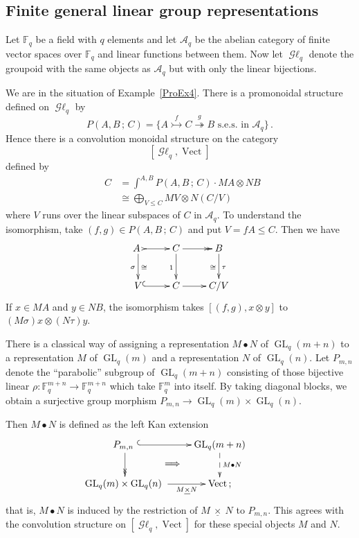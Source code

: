 \documentclass[a4paper,12pt]{article}
\theoremstyle{definition}
\theoremstyle{fact}
\theoremstyle{genquest}
\theoremstyle{step}
\newcommand{\catA}{\mathcal{A}}
\newcommand{\FF}{\mathbb{F}}
\newcommand{\GL}{\operatorname{GL}}
\newcommand{\catGL}{\mathop{\mathcal{G}\ell}\nolimits}
\newcommand{\Vect}{\operatorname{Vect}}
\begin{document}
\subsection{Finite general linear group representations} 

Let $\FF_q$ be a field with $q$ elements
and let $\catA_q$ be the abelian category of finite vector spaces over $\FF_q$ and linear functions between them.   
Now let $\catGL_q$ denote the groupoid with the same objects as $\catA_q$ but with only the linear bijections.


We are in the situation of Example~\ref{ProEx4}.   
There is a promonoidal structure defined on $\catGL_q$ by 
\[
P(A,B\,;\,C) = \{A \stackrel{f}{\rightarrowtail}  C  \stackrel{g}{\twoheadrightarrow} B \text{ s.e.s. in } \catA_q\}\,.
\]
Hence there is a convolution monoidal structure on the category
\[
[\catGL_q, \Vect]
\]
defined by
\begin{align*}
\mathop{(M \bullet N)} C &= \int^{A,B} P(A,B\,;\,C) \cdot MA \otimes NB
\\
&\cong \bigoplus_{V \leq C} MV \otimes N(C/V)
\end{align*}
where $V$ runs over the linear subspaces of $C$ in $\catA_q$.  
To understand the isomorphism, take $(f,g) \in P (A,B\,;\,C)$ and put $V = fA \leq C$.    
Then we have
\[
\xymatrix{
A \  \ar[d]_\sigma^\cong  \ar@{>->}[r] &C \ar[d]_1 \ar@{>>}[r] &    B  \ar[d]_\cong^\tau \\
 V \ar@{^{(}->}[r] &  C \ar[r] &     C/V 
 }\]
If $x \in  MA$ and $y \in NB$, the isomorphism takes $[(f,g),x\otimes y]$ to $(M\sigma) x \otimes (N\tau) y$.

\medskip

There is a classical way of assigning a representation $M \bullet N$ of $\GL_q (m+n)$ to a representation $M$ of $\GL_q(m)$ and a representation $N$ of $\GL_q(n)$.   Let $P_{m,n}$ denote the ``parabolic'' subgroup of $\GL_q(m+n)$ consisting of those bijective linear $\rho : \FF_q^{m+n} \to \FF_q^{m+n}$ which take $\FF^m_q$ into itself.    By taking diagonal blocks, we obtain a surjective group morphism $P_{m,n} \to \GL_q (m) \times \GL_q (n)$.

Then $M \bullet N$ is defined as the left Kan extension
\[
\xymatrix{
P_{m,n}  \  \ar@{>>}[d]  \ar@{^{(}->}[r]  \ar@{}[rd]|*{\Longrightarrow}
&   \GL_q (m+n)  \ar@{-->}[d]^{M \bullet N}  & \\
 \GL_q (m) \times \GL_q (n)  \ \ar[r]_-{M \underline{\times} N} &   \Vect\,;
 }
 \]
that is, $M \bullet N$ is induced by the restriction of $M \  \underline{\times} \  N$ to $P_{m,n}$.   
This agrees with the convolution structure on $[\catGL_q, \Vect]$ for these special objects $M$ and $N$. 
\end{document}
